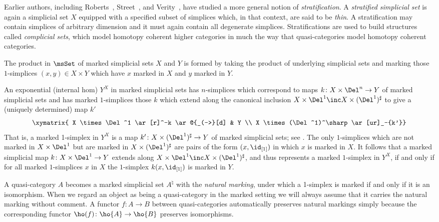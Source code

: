         \begin{rmk}
Earlier authors, including Roberts~\cite{Roberts:1978:Complicial}, Street~\cite{Street:1987:Oriental}, and Verity~\cite{Verity:2008sr,Verity:2007:wcs1}, have studied a more general notion of {\em stratification}. A {\em stratified simplicial set\/} is again a simplicial set $X$ equipped with a specified subset of simplices which, in that context, are said to be {\em thin}. A stratification may contain simplices of arbitrary dimension and it must again contain all degenerate simplices. Stratifications are used to build structures called {\em complicial sets\/}, which model homotopy coherent higher categories in much the way that quasi-categories model homotopy coherent categories.
    \end{rmk}

    \begin{rec}\label{rec:marked-prod-exp}
The product in $\msSet$ of marked simplicial sets $X$ and $Y$ is formed by taking the product of underlying simplicial sets and marking those $1$-simplices $(x,y)\in X\times Y$ which have $x$ marked in $X$ and $y$ marked in $Y$.

      An exponential (internal hom) $Y^X$ in marked simplicial sets has $n$-simplices which correspond to maps $k\colon X\times\Del^n\to Y$ of marked simplicial sets and has marked $1$-simplices those $k$ which extend along the canonical inclusion $X\times\Del^1\inc X\times(\Del^1)^\sharp$ to give a (uniquely determined) map $k'$ \[\xymatrix{ X \times \Del^1 \ar[r]^-k \ar@{_(->}[d] & Y \\ X \times (\Del^1)^\sharp \ar[ur]_-{k'}}\] That is, a marked 1-simplex in $Y^X$ is a map $k'\colon X \times (\Del^1)^\sharp \to Y$ of marked simplicial sets; see \cite[\S 3.1.3]{Lurie:2009fk}.
     The only $1$-simplices which are not marked in $X\times\Del^1$ but are marked in $X\times(\Del^1)^\sharp$ are pairs of the form $(x,\id_{[1]})$ in which $x$ is marked in $X$. It follows that a marked simplicial map $k\colon X\times\Del^1\to Y$ extends along $X\times\Del^1\inc X\times(\Del^1)^\sharp$, and thus represents a marked $1$-simplex in $Y^X$, if and only if for all marked $1$-simplices $x$ in $X$ the $1$-simplex $k(x,\id_{[1]})$ is marked in $Y$.
    \end{rec}

    \begin{rec}\label{rmk:equiv-markings}
A quasi-category $A$ becomes a marked simplicial set $A^\natural$ with the {\em natural marking}, under which a 1-simplex is marked if and only if it is an isomorphism. When we regard an object as being a quasi-category in the marked setting we will always assume that it carries the natural marking without comment. A functor $f\colon A\to B$ between quasi-categories automatically preserves natural markings simply because the corresponding functor $\ho(f)\colon\ho{A}\to\ho{B}$ preserves isomorphisms.
\end{rec}

